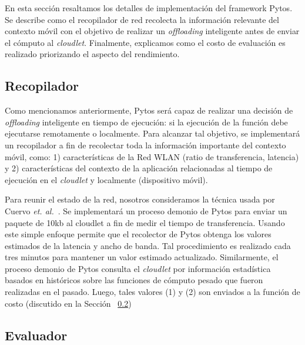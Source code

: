 En esta sección resaltamos los detalles de implementación del framework Pytos. Se describe como el recopilador de red recolecta la información 
relevante del contexto móvil con el objetivo de realizar un \textit{offloading} inteligente antes de enviar el cómputo al \textit{cloudlet}. 
Finalmente, explicamos como el costo de evaluación es realizado priorizando el aspecto del rendimiento. 


\subsection{Recopilador}

Como mencionamos anteriormente, Pytos será capaz de realizar una decisión de \textit{offloading} inteligente en tiempo de ejecución: si la 
ejecución de la función debe ejecutarse remotamente o localmente. Para alcanzar tal objetivo, se implementará un recopilador a fin de recolectar
toda la información importante del contexto móvil, como: 1) características de la Red WLAN (ratio de transferencia, latencia) y 2) características
del contexto de la aplicación relacionadas al tiempo de ejecución en el \textit{cloudlet} y localmente (dispositivo móvil).

Para reunir el estado de la red, nosotros consideramos la técnica usada por Cuervo {\em et. al.}~\cite{Cuervo:2010:MMS:1814433.1814441}. Se 
implementará un proceso demonio de Pytos para enviar un paquete de 10kb al cloudlet a fin de medir el tiempo de transferencia. Usando este simple
enfoque permite que el recolector de Pytos obtenga los valores estimados de la latencia y ancho de banda. Tal procedimiento es realizado cada tres 
minutos para mantener un valor estimado actualizado. 
Similarmente, el proceso demonio de Pytos consulta el \textit{cloudlet} por información estadística basados en históricos sobre las funciones de 
cómputo pesado que fueron realizadas en el pasado. Luego, tales valores (1) y (2) son enviados a la función de costo (discutido en la Sección 
~\ref{sec:intelligentOffloading})

\subsection{Evaluador}
\label{sec:intelligentOffloading}

